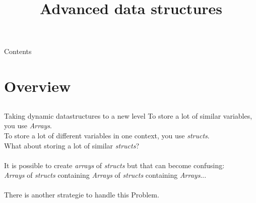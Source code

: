 
\newcommand{\topic}{
	Advanced data structures
}

\usepackage{tikz}

\title{\topic}
\supertitle{\course}
\date{}



\maketitle

\begin{frame}{Contents}
	\tableofcontents
\end{frame}
\section{Overview}
\subsection{}
\begin{frame}{Taking dynamic datastructures to a new level}
	To store a lot of similar variables, you use \textit{Arrays}.\\
	To store a lot of different variables in one context, you use \textit{structs}.\\
	What about storing a lot of similar \textit{structs}?\\
	\ \\
	It is possible to create \textit{arrays} of \textit{structs} but that can become confusing:\\
	\textit{Arrays} of \textit{structs} containing \textit{Arrays} of \textit{structs} containing \textit{Arrays}...\\
	\ \\
	There is another strategie to handle this Problem.
\end{frame}

